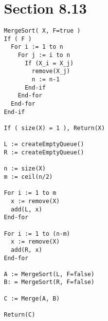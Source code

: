 \documentclass{article}
\newcommand{\assignment}{Section 8.13}
\begin{document}
\section*{\assignment}

\begin{enumerate}
  \begin{lstlisting}
MergeSort( X, F=true )
If ( F )
  For i := 1 to n
    For j := i to n
      If (X_i = X_j)
        remove(X_j)
        n := n-1
      End-if
    End-for
  End-for
End-if

If ( size(X) = 1 ), Return(X)

L := createEmptyQueue()
R := createEmptyQueue()

n := size(X)
m := ceil(n/2)

For i := 1 to m
  x := remove(X)
  add(L, x)
End-for

For i := 1 to (n-m)
  x := remove(X)
  add(R, x)
End-for

A := MergeSort(L, F=false)
B: = MergeSort(R, F=false)

C := Merge(A, B)

Return(C)
    \end{lstlisting}
    \qdash
\end{enumerate}
\end{document}
